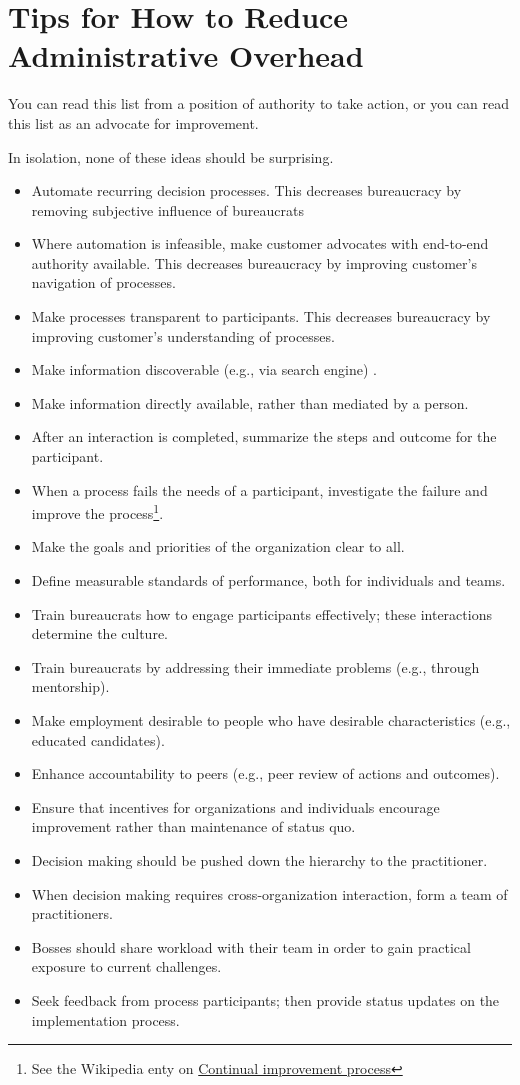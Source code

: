 \section{Tips for How to Reduce Administrative Overhead\label{sec:reducing-overhead}}

You can read this list from a position of authority to take action, or you can read this list as an advocate for improvement. 

In isolation, none of these ideas should be surprising.
\begin{itemize}
    \item Automate recurring decision processes. This decreases bureaucracy by removing subjective influence of bureaucrats
\item Where automation is infeasible, make customer advocates with end-to-end authority available. 
This decreases bureaucracy by improving customer's navigation of processes.
\item Make processes transparent to participants. 
This decreases bureaucracy by improving customer's understanding of processes.
\item Make information discoverable (e.g., via search engine) .
\item Make information directly available, rather than mediated by a person.
\item After an interaction is completed, summarize the steps and outcome for the participant. 
\item When a process fails the needs of a participant, investigate the failure and improve the process\footnote{See the Wikipedia enty on \href{https://en.wikipedia.org/wiki/Continual_improvement_process}{Continual improvement process}}. 
\item Make the goals and priorities of the organization clear to all.
\item Define measurable standards of performance, both for individuals and teams.
\item Train bureaucrats how to engage participants effectively; these interactions determine the culture.
\item Train bureaucrats by addressing their immediate problems (e.g., through mentorship).
\item Make employment desirable to people who have desirable characteristics (e.g., educated candidates).
\item Enhance accountability to peers (e.g., peer review of actions and outcomes).
\item Ensure that incentives for organizations and individuals encourage improvement rather than maintenance of status quo.
\item Decision making should be pushed down the hierarchy to the practitioner.
\item When decision making requires cross-organization interaction, form a team of practitioners.
\item Bosses should share workload with their team in order to gain practical exposure to current challenges.
\item Seek feedback from process participants; then provide status updates on the implementation process.


\end{itemize}
